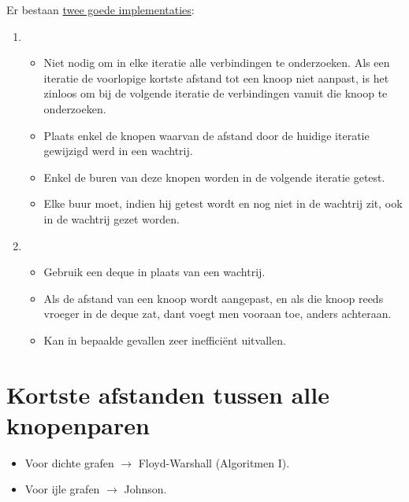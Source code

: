 Er bestaan \underline{twee goede implementaties}:
\begin{enumerate}
	\item \begin{itemize}
		\item  Niet nodig om in elke iteratie alle verbindingen te onderzoeken. Als een iteratie de voorlopige kortste afstand tot een knoop niet aanpast, is het zinloos om bij de volgende iteratie de verbindingen vanuit die knoop te onderzoeken.
		\item  Plaats enkel de knopen waarvan de afstand door de huidige iteratie gewijzigd werd in een wachtrij.
		\item  Enkel de buren van deze knopen worden in de volgende iteratie getest.
		\item  Elke buur moet, indien hij getest wordt en nog niet in de wachtrij zit, ook in de wachtrij gezet worden.
	\end{itemize}
	\item \begin{itemize}
		\item Gebruik een deque in plaats van een wachtrij.
		\item Als de afstand van een knoop wordt aangepast, en als die knoop reeds vroeger in de deque zat, dant voegt men vooraan toe, anders achteraan.
		\item Kan in bepaalde gevallen zeer inefficiënt uitvallen.
	\end{itemize}

\end{enumerate}

\section{Kortste afstanden tussen alle knopenparen}
\begin{itemize}
	\item Voor dichte grafen $\rightarrow$ Floyd-Warshall (Algoritmen I).
	\item Voor ijle grafen $\rightarrow$ Johnson.
\end{itemize}
